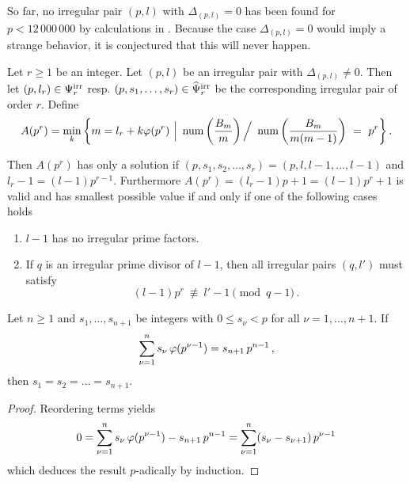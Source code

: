 \documentclass[12pt,english]{article}
\begin{document}
So far, no irregular pair $(p,l)$ with $\Delta_{(p,l)} = 0$ has been found
for $p < 12\,000\,000$ by calculations in \cite{irrprime12M}.
Because the case $\Delta_{(p,l)} = 0$ would
imply a strange behavior, it is conjectured that this will never happen.

\begin{theorem} \label{theor-Apr-small}
Let $r \geq 1$ be an integer.
Let $(p,l)$ be an irregular pair with $\Delta_{(p,l)} \neq 0$.
Then let $(p,l_r) \in \Psi^{\rm irr}_r$ resp. $(p,s_1,\ldots,s_r) \in \widehat{\Psi}^{\rm irr}_r$ be
the corresponding irregular pair of order $r$.
Define
\[
   A(p^r) = \min_k
     \left\{ m=l_r+k\varphi(p^r) \,\,\Big|\,\,
        \mathop{\rm num}\nolimits \left( \frac{B_m}{m} \right) \Big/ \
           \mathop{\rm num}\nolimits \left( \frac{B_m}{m(m-1)} \right) \ = \ p^r \right\} .
\]

Then $A(p^r)$ has only a solution if $(p,s_1,s_2,\ldots,s_r) = (p,l,l-1,\ldots,l-1)$ and
$l_r-1 = (l-1) p^{r-1} $. Furthermore $A(p^r) = (l_r-1)p+1 = (l-1)p^r+1$ is valid and
has smallest possible value if and only if one of the following cases holds
\begin{enumerate}
\item $l-1$ has no irregular prime factors.
\item If $q$ is an irregular prime divisor of $l-1$, then
all irregular pairs $(q,l')$ must satisfy
\[
   (l-1)p^r \ \not\equiv \ l'-1 \pmod{q-1} \,.
\]
\end{enumerate}
\end{theorem}

\begin{lemma} \label{lem-p-adic}
Let $n \geq 1$ and $s_1,\ldots,s_{n+1}$ be integers with $0 \leq s_\nu < p$ for all
$\nu=1,\ldots,n+1$. If
\[
   \sum_{\nu=1}^n s_\nu \, \varphi(p^{\nu-1}) = s_{n+1} \, p^{n-1} \,,
\]
then $s_1=s_2=\ldots=s_{n+1}$.
\end{lemma}

\begin{proof} Reordering terms yields
\[
   0 = \sum_{\nu=1}^n s_\nu \, \varphi(p^{\nu-1}) - s_{n+1} \, p^{n-1}
     = \sum_{\nu=1}^n (s_\nu - s_{\nu+1}) \, p^{\nu-1}
\]
which deduces the result $p$-adically by induction.
\end{proof}
\end{document}
